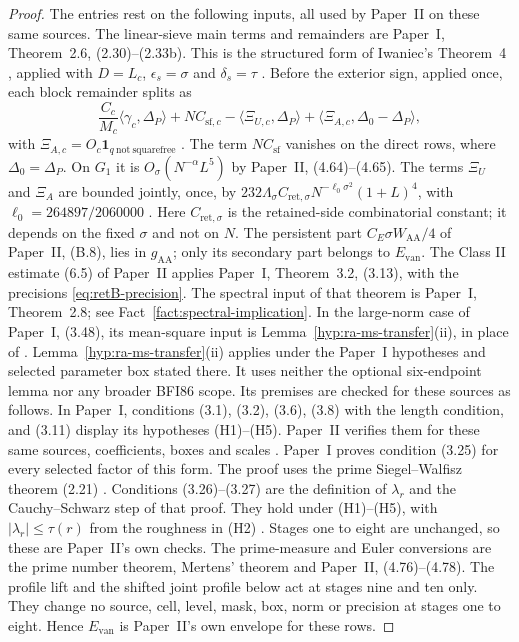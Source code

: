 \begin{proof}
The entries rest on the following inputs, all used by Paper~II on these
same sources.
The linear-sieve main terms and remainders are Paper~I, Theorem~2.6,
(2.30)--(2.33b). This is the structured form of Iwaniec's Theorem~4
\cite[Theorem~4, p.~311]{Iwaniec1980Remainder}, applied with $D=L_c$,
$\epsilon_s=\sigma$ and $\delta_s=\tau$ \cite[\S6.2]{PaperII}.
Before the exterior sign, applied once, each block remainder splits as
\[
 \frac{C_c}{M_c}\langle\gamma_c,\Delta_P\rangle+NC_{\mathrm{sf},c}
 -\langle\Xi_{U,c},\Delta_P\rangle+\langle\Xi_{A,c},\Delta_0-\Delta_P\rangle,
\]
with $\Xi_{A,c}=O_c\mathbf 1_{q\ \mathrm{not\ squarefree}}$
\cite[(6.4a)--(6.4b), (4.23)]{PaperII}.
The term $NC_{\mathrm{sf}}$ vanishes on the direct rows, where
$\Delta_0=\Delta_P$. On $G_1$ it is $O_\sigma(N^{-\alpha}L^5)$ by Paper~II,
(4.64)--(4.65). The terms $\Xi_U$ and $\Xi_A$ are bounded jointly, once, by
$232\Lambda_\sigma C_{\mathrm{ret},\sigma} N^{-\ell_0\sigma^2}(1+L)^4$, with
$\ell_0=264897/2060000$ \cite[(B.1)--(B.7)]{PaperII}.
Here $C_{\mathrm{ret},\sigma}$ is the retained-side combinatorial constant;
it depends on the fixed $\sigma$ and not on $N$.
The persistent part $C_E\sigma W_{\mathrm{AA}}/4$ of Paper~II, (B.8), lies in
$g_{\mathrm{AA}}$; only its secondary part belongs to $E_{\mathrm{van}}$.
The Class II estimate (6.5) of Paper~II applies Paper~I, Theorem~3.2, (3.13),
with the precisions \eqref{eq:retB-precision}. The spectral input of that
theorem is Paper~I, Theorem~2.8; see Fact~\ref{fact:spectral-implication}.
In the large-norm case of Paper~I, (3.48), its mean-square input is
Lemma~\ref{hyp:ra-ms-transfer}(ii), in place of \cite[Theorem~0(a)]{BFI86}.
Lemma~\ref{hyp:ra-ms-transfer}(ii) applies under the Paper~I
hypotheses and selected parameter box stated there.
It uses neither the optional six-endpoint lemma nor any broader BFI86 scope.
Its premises are checked for these sources as follows. In Paper~I, conditions (3.1), (3.2), (3.6), (3.8) with
the length condition, and (3.11) display its hypotheses (H1)--(H5). Paper~II verifies them for these same sources, coefficients,
boxes and scales \cite[\S6.2, hypothesis table, row ``C1--C5, LEN'']{PaperII}.
Paper~I proves condition (3.25) for every selected factor of this form.
The proof uses the prime Siegel--Walfisz theorem (2.21) \cite[(3.25) and its
proof]{PaperI}. Conditions (3.26)--(3.27) are the definition of $\lambda_r$
and the Cauchy--Schwarz step of that proof. They hold under (H1)--(H5), with
$|\lambda_r|\le\tau(r)$ from the roughness in (H2) \cite[(3.26)--(3.27)]{PaperI}.
Stages one to eight are unchanged, so these are Paper~II's own checks. The prime-measure and Euler
conversions are the prime number theorem, Mertens' theorem and Paper~II,
(4.76)--(4.78).
The profile lift and the shifted joint profile below act at stages nine
and ten only. They change no source, cell, level, mask, box, norm or
precision at stages one to eight. Hence $E_{\mathrm{van}}$ is Paper~II's own
envelope for these rows.
\end{proof}

